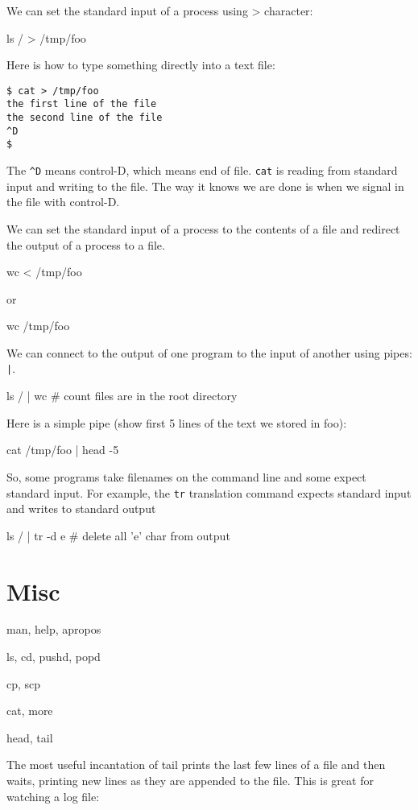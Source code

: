 \begin{fullwidth}
We can set the standard input of a process using > character:

{\small
\bash[script,stdout,prefix=$]
ls / > /tmp/foo
\END
}

Here is how to type something directly into a text file:
 
\begin{lstlisting}[style=BashInputStyle]
$ cat > /tmp/foo
the first line of the file
the second line of the file
^D
$ 
\end{lstlisting}

\noindent The {\tt \^{}D} means control-D, which means end of file.  {\tt cat} is reading from standard input and writing to the file. The way it knows we are done is when we signal in the file with control-D.

We can set the standard input of a process to the contents of a file and redirect the output of a process to a file.

{\small
\bash[script,stdout,prefix=$]
wc < /tmp/foo
\END
}

or

{\small
\bash[script,stdout,prefix=$]
wc /tmp/foo
\END
}

We can connect to the output of one program to the input of another using pipes: {\tt |}. 

{\small
\bash[script,stdout,prefix=$]
ls / | wc # count files are in the root directory
\END
}

Here is a simple pipe (show first 5 lines of the text we stored in foo):

{\small
\bash[script,stdout,prefix=$]
cat /tmp/foo | head -5 
\END
}

So, some programs take filenames on the command line and some expect standard input. For example, the {\tt tr} translation command expects standard input and writes to standard output

{\small
\bash[script,stdout,prefix=$]
ls / | tr -d e # delete all 'e' char from output
\END
}

\section{Misc}

man, help, apropos

ls, cd, pushd, popd

cp, scp

cat, more

head, tail

The most useful incantation of tail prints the last few lines of a file and then waits, printing new lines as they are appended to the file. This is great for watching a log file:


\end{fullwidth}
